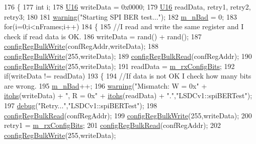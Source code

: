 \begin{DoxyCode}
176 \{
177     \textcolor{keywordtype}{int} i;
178     \hyperlink{ICECALv3_8h_adf928e51a60dba0df29d615401cc55a8}{U16} writeData = 0x0000;
179     \hyperlink{ICECALv3_8h_adf928e51a60dba0df29d615401cc55a8}{U16} readData, retry1, retry2, retry3;
180 
181     \hyperlink{classObject_a65cd4fda577711660821fd2cd5a3b4c9}{warning}(\textcolor{stringliteral}{"Starting SPI BER test..."});
182     \hyperlink{classLSDelayChipV1_a425c69ef8f3d64d93cb1c86b83bbceec}{m\_nBad} = 0;
183     \textcolor{keywordflow}{for}(i=0;i<nFrames;i++)
184     \{
185         \textcolor{comment}{//I read and write the same register and I check if read data is OK.}
186         writeData = rand() + rand();    
187         \hyperlink{classLSDelayChipV1_afa626b5d52f8723bcaa3205d1cc7a0f8}{configRegBulkWrite}(confRegAddr,writeData);
188 \hyperlink{classLSDelayChipV1_afa626b5d52f8723bcaa3205d1cc7a0f8}{configRegBulkWrite}(255,writeData);
189         \hyperlink{classLSDelayChipV1_a97a50092ce40f6322db946fc580f7230}{configRegBulkRead}(confRegAddr);    
190 \hyperlink{classLSDelayChipV1_afa626b5d52f8723bcaa3205d1cc7a0f8}{configRegBulkWrite}(255,writeData);
191         readData = \hyperlink{classLSDelayChipV1_ae049797212539b231b9722ae69a0491d}{m\_rxConfigBits};
192         \textcolor{keywordflow}{if}(writeData != readData)
193         \{
194             \textcolor{comment}{//If data is not OK I check how many bits are wrong.}
195             \hyperlink{classLSDelayChipV1_a425c69ef8f3d64d93cb1c86b83bbceec}{m\_nBad}++;
196             \hyperlink{classObject_a65cd4fda577711660821fd2cd5a3b4c9}{warning}(\textcolor{stringliteral}{"Mismatch: W = 0x"} + \hyperlink{classLSDelayChipV1_af7f4d72fb404b6b3d7b41fd01876ed0a}{itohs}(writeData) + \textcolor{stringliteral}{", R = 0x"} + 
      \hyperlink{classLSDelayChipV1_af7f4d72fb404b6b3d7b41fd01876ed0a}{itohs}(readData) + \textcolor{stringliteral}{"."},\textcolor{stringliteral}{"LSDCv1::spiBERTest"});
197             \hyperlink{classObject_aac010553f022165573714b7014a15f0d}{debug}(\textcolor{stringliteral}{"Retry..."},\textcolor{stringliteral}{"LSDCv1::spiBERTest"});
198             \hyperlink{classLSDelayChipV1_a97a50092ce40f6322db946fc580f7230}{configRegBulkRead}(confRegAddr);
199 \hyperlink{classLSDelayChipV1_afa626b5d52f8723bcaa3205d1cc7a0f8}{configRegBulkWrite}(255,writeData);            
200             retry1 = \hyperlink{classLSDelayChipV1_ae049797212539b231b9722ae69a0491d}{m\_rxConfigBits};
201             \hyperlink{classLSDelayChipV1_a97a50092ce40f6322db946fc580f7230}{configRegBulkRead}(confRegAddr);
202 \hyperlink{classLSDelayChipV1_afa626b5d52f8723bcaa3205d1cc7a0f8}{configRegBulkWrite}(255,writeData);            

\end{DoxyCode}
